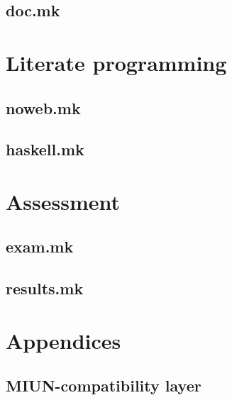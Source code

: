 \documentclass{report}
\begin{document}
\chapter{doc.mk}



\part{Literate programming}

\chapter{noweb.mk}


\chapter{haskell.mk}



\part{Assessment}

\chapter{exam.mk}


\chapter{results.mk}



\appendix
\part{Appendices}

\chapter{MIUN-compatibility layer}



\printbibliography[heading=bibintoc]{}
\end{document}
